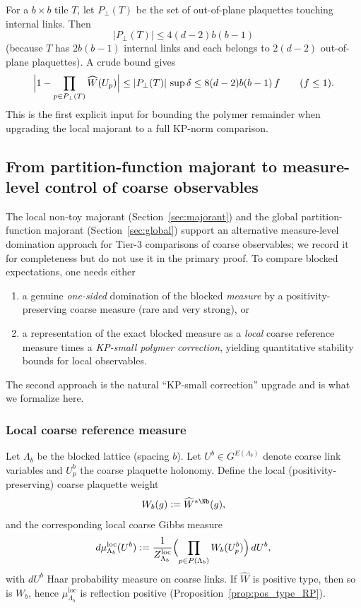 For a $b\times b$ tile $T$, let $P_{\perp}(T)$ be the set of out-of-plane plaquettes touching internal links.
Then
\begin{equation}\label{eq:Pperp_count}
|P_{\perp}(T)|\le 4(d-2)b(b-1)
\end{equation}
(because $T$ has $2b(b-1)$ internal links and each belongs to $2(d-2)$ out-of-plane plaquettes).
A crude bound gives
\begin{equation}\label{eq:tile_polymer_bound}
\Bigl|1-\prod_{p\in P_{\perp}(T)} \widehat W(U_p)\Bigr|
\le |P_{\perp}(T)|\,\sup\delta
\le 8(d-2)b(b-1)\,f\qquad(f\le 1).
\end{equation}
This is the first explicit input for bounding the polymer remainder when upgrading the local majorant to a full KP-norm comparison.


\subsection{From partition-function majorant to measure-level control of coarse observables}\label{sec:measure_level}

The local non-toy majorant (Section~\ref{sec:majorant}) and the global partition-function majorant (Section~\ref{sec:global}) support an alternative measure-level domination approach for Tier-3 comparisons of coarse observables; we record it for completeness but do not use it in the primary proof.
To compare blocked expectations, one needs either
\begin{enumerate}[leftmargin=*]
\item a genuine \emph{one-sided} domination of the blocked \emph{measure} by a positivity-preserving coarse measure (rare and very strong), or
\item a representation of the exact blocked measure as a \emph{local} coarse reference measure times a \emph{KP-small polymer correction}, yielding quantitative stability bounds for local observables.
\end{enumerate}
The second approach is the natural ``KP-small correction'' upgrade and is what we formalize here.

\subsubsection{Local coarse reference measure}

Let $\Lambda_b$ be the blocked lattice (spacing $b$).
Let $U^b\in G^{E(\Lambda_b)}$ denote coarse link variables and $U^b_p$ the coarse plaquette holonomy.
Define the local (positivity-preserving) coarse plaquette weight
\begin{equation}\label{eq:Wb_def}
W_b(g):=\widehat W^{*\Nb}(g),
\end{equation}
and the corresponding local coarse Gibbs measure
\begin{equation}\label{eq:mu_loc_def}
d\mu^{\mathrm{loc}}_{\Lambda_b}(U^b)
:=
\frac{1}{Z^{\mathrm{loc}}_{\Lambda_b}}
\Bigl(\prod_{p\in P(\Lambda_b)} W_b(U^b_p)\Bigr)\,dU^b,
\end{equation}
with $dU^b$ Haar probability measure on coarse links.
If $\widehat W$ is positive type, then so is $W_b$, hence $\mu^{\mathrm{loc}}_{\Lambda_b}$ is reflection positive (Proposition~\ref{prop:pos_type_RP}).

